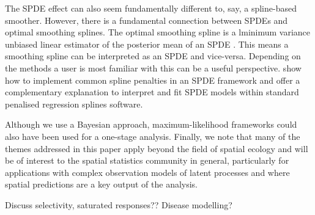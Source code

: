 \documentclass[preprint,12pt]{elsarticle}
\begin{document}
The SPDE effect can also seem fundamentally different to, say, a spline-based smoother.  However, there is a fundamental connection between SPDEs and optimal smoothing splines.  The optimal smoothing spline is a lminimum variance unbiased linear estimator of the posterior mean of an SPDE \citep{kimeldorf_spline_2002}.  This means a smoothing spline can be interpreted as an SPDE and vice-versa.  Depending on the methods a user is most familiar with this can be a useful perspective.  \cite{yue_bayesian_2014} show how to implement common spline penalties in an SPDE framework and \cite{miller_understanding_2019} offer a complementary explanation to interpret and fit SPDE models within standard penalised regression splines software.

Although we use a Bayesian approach, maximum-likelihood frameworks could also have been used for a one-stage analysis.  
Finally, we note that many of the themes addressed in this paper apply beyond the field of spatial ecology and will be of interest to the spatial statistics community in general, particularly for applications with complex observation models of latent processes and where spatial predictions are a key output of the analysis. 

Discuss selectivity, saturated responses?? Disease modelling?

\clearpage


\end{document}
